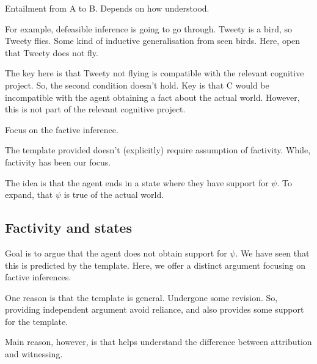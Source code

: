 \documentclass[10pt]{article}
\begin{document}
\begin{note}
  Entailment from A to B.
  Depends on how understood.

  For example, defeasible inference is going to go through.
  Tweety is a bird, so Tweety flies.
  Some kind of inductive generalisation from seen birds.
  Here, open that Tweety does not fly.

  The key here is that Tweety not flying is compatible with the relevant cognitive project.
  So, the second condition doesn't hold.
  Key is that C would be incompatible with the agent obtaining a fact about the actual world.
  However, this is not part of the relevant cognitive project.
\end{note}

\begin{note}
  Focus on the factive inference.

  The template provided doesn't (explicitly) require assumption of factivity.
  While, factivity has been our focus.

  The idea is that the agent ends in a state where they have support for \(\psi\).
  To expand, that \(\psi\) is true of the actual world.
\end{note}

\subsection{Factivity and states}
\label{sec:factivity-states}

\begin{note}
  Goal is to argue that the agent does not obtain support for \(\psi\).
  We have seen that this is predicted by the template.
  Here, we offer a distinct argument focusing on factive inferences.

  One reason is that the template is general.
  Undergone some revision.
  So, providing independent argument avoid reliance, and also provides some support for the template.

  Main reason, however, is that helps understand the difference between attribution and witnessing.
\end{note}
\end{document}

